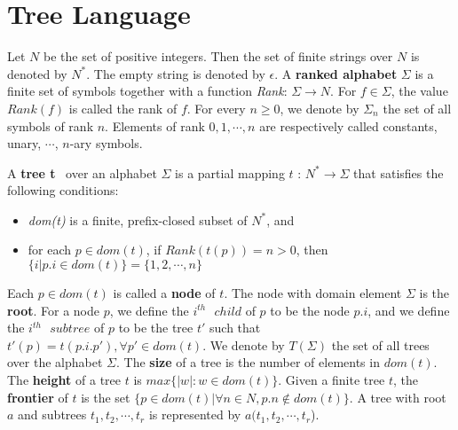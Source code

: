 \section{Tree Language}
Let $N$ be the set of positive integers. Then the set of finite strings over $N$ is denoted by $N^*$. 
The empty string is denoted by $\epsilon$. A \textbf{ranked alphabet} $\Sigma$ is a finite set of symbols together
with a function \emph{Rank}: $\Sigma\rightarrow N$. For $f\in \Sigma$, the value $Rank(f)$ is called the rank of $f$.
 For every $n\geq 0$, we denote by $\Sigma _n$ the set of all symbols of rank $n$. Elements of rank $0,1,\cdots ,n$
 are respectively called constants, unary, $\cdots$, $n$-ary symbols.

 A \textbf{tree t}~\cite{hubert} over an alphabet $\Sigma$ is a partial mapping $t$ : $N^*\rightarrow \Sigma$ that satisfies the
 following conditions:
\begin{itemize}%
\item \emph{dom(t)} is a finite, prefix-closed subset of $N^*$, and
\item for each $p\in dom(t)$, if  $Rank(t(p)) = n > 0$, then $\{i|p.i \in dom(t)\}=\{1,2,\cdots ,n\}$
\end{itemize}
Each $p\in dom(t)$ is called a \textbf{node} of $t$. The node with domain element $\Sigma$ is the \textbf{root}. 
For a node $p$, we define the $i^{th} \mbox{ } child$ of $p$ to be the node $p.i$, and we define the
$i^{th} \mbox{ } subtree$ of $p$ to be the tree $t'$ such that $t'(p)=t(p.i.p'),\forall p' \in dom(t)$. We denote 
by $T(\Sigma )$ the set of all trees over the alphabet $\Sigma$. The \textbf{size} of a tree is the number 
of elements in $dom(t)$. The \textbf{height} of a tree $t$ is $max\{|w|:w\in dom(t)\}$. Given a finite tree $t$, 
   the \textbf{frontier} of $t$ is the set $\{p\in dom(t)|\forall n\in N,p.n \notin dom(t)\}$. A tree with root $a$
   and subtrees $t_1,t_2,\cdots ,t_r$ is represented by $a(t_1,t_2,\cdots ,t_r$).
